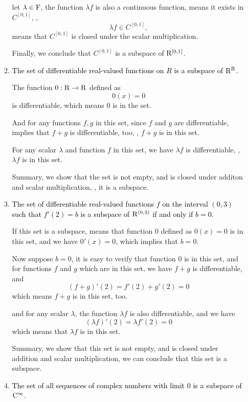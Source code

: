 \begin{enumerate}
\begin{solution}
\begin{enumerate}[label=(\alph*)]
                    let $\lambda \in \mathrm{F}$, the function $\lambda f$ is also a continuous function, means it exists in $C^{[0,1]}$, 
                    \ie, \[ \lambda f \in C^{[0,1]},\]
                    means that $C^{[0,1]}$ is closed under the scalar multiplication.

                    Finally, we conclude that $C^{[0,1]}$ is a subspace of $\mathrm{R}^{[0,1]}$.
                \item \textcolor{black}{The set of differentiable real-valued functions on $R$ is a subspace of $\mathrm{R}^{\mathrm{R}}$.}
                    
                    The function $0:\mathrm{R} \to \mathrm{R}$ defined as 
                        \[ 0(x) = 0\]
                    is differentiable, which means $0$ is in the set.

                    And for any functions $f, g$ in this set, since $f$ and $g$ are differentiable, implies that $f + g$ is differentiable, too,
                    \ie, $f + g$ is in this set.

                    For any scalar $\lambda$ and function $f$ in this set, we have $\lambda f$ is differentiable, \ie, $\lambda f$ is in this set.

                    Summary, we show that the set is not empty, and is closed under additon and scalar multiplication, \ie, it is a subspace.
                \item \textcolor{black}{The set of differentiable real-valued functions $f$ on the interval $(0,3)$ such that $f'(2)=b$ is a subspace of $\mathrm{R}^{(0,3)}$ if 
                    and only if $b=0$.}

                    If this set is a subspace, means that function $0$ defined as $0(x) = 0$ is in this set, and we have $0'(x)=0$, which implies that $b=0$.

                    Now suppose $b=0$, it is easy to verify that function $0$ is in this set,
                    and for functions $f$ and $g$ which are in this set, we have $f + g$ is differentiable, and 
                    \[(f+g)'(2) = f'(2) + g'(2) = 0\]
                    which means $f + g$ is in this set, too.

                    and for any scalar $\lambda$, the function $\lambda f$ is also differentiable, and we have 
                    \[ (\lambda f)'(2) = \lambda f'(2) = 0\]
                    which means that $\lambda f$ is in this set. 

                    Summary, we show that this set is not empty, and is closed under addition and scalar multiplication, we can conclude that this set is a subspace.
                \item \textcolor{black}{The set of all sequences of complex numbers with limit $0$ is a subspace of $\mathrm{C}^{\infty}$.}
                

\end{enumerate}
\end{solution}
\end{enumerate}
